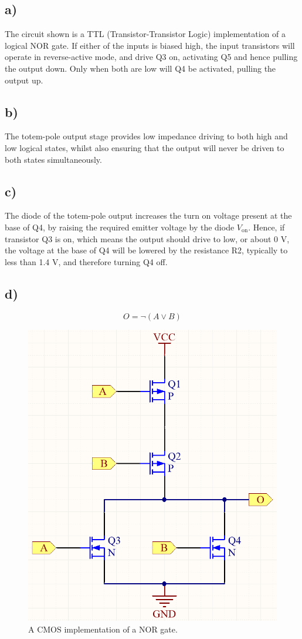 \subsection*{a)}
	The circuit shown is a TTL (Transistor-Transistor Logic) implementation of a logical NOR gate. If either of the inputs is biased high, the input transistors will operate in reverse-active mode, and drive Q3 on, activating Q5 and hence pulling the output down. Only when both are low will Q4 be activated, pulling the output up.
\subsection*{b)}
	The totem-pole output stage provides low impedance driving to both high and low logical states, whilst also ensuring that the output will never be driven to both states simultaneously.
\subsection*{c)}
	The diode of the totem-pole output increases the turn on voltage present at the base of Q4, by raising the required emitter voltage by the diode $V_\mathrm{on}$. Hence, if transistor Q3 is on, which means the output should drive to low, or about 0 V, the voltage at the base of Q4 will be lowered by the resistance R2, typically to less than 1.4 V, and therefore turning Q4 off.
\subsection*{d)}
	$$ O = \lnot(A \lor B) $$
	\begin{figure}[htbp!]
		\centering
		\includegraphics[height=0.4\textheight]{img/nor_gate}
		\caption{A CMOS implementation of a NOR gate.}
	\end{figure}